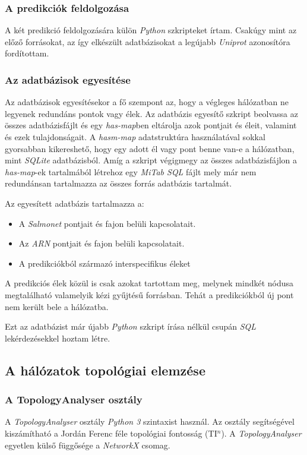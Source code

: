\documentclass[a4paper,12pt]{article}
\begin{document}
			\subsubsection{A predikciók feldolgozása} 
			A két predikció feldolgozására külön \textit{Python} szkripteket írtam. Csakúgy mint az előző forrásokat, az így elkészült adatbázisokat a legújabb \textit{Uniprot} azonosítóra fordítottam.
			
			
		

	\subsubsection{Az adatbázisok egyesítése}
		Az adatbázisok egyesítésekor a fő szempont az, hogy a végleges hálózatban ne legyenek redundáns pontok vagy élek. Az adatbázis egyesítő szkript beolvassa az összes adatbázisfájlt és egy \textit{has-map}ben eltárolja azok pontjait és éleit, valamint és ezek tulajdonságait. A \textit{hasm-map} adatstruktúra használatával sokkal gyorsabban kikereshető, hogy egy adott él vagy pont benne van-e a hálózatban, mint \textit{SQLite} adatbázisból. Amíg a szkript végigmegy az összes adatbázisfájlon a \textit{has-map}-ek tartalmából létrehoz egy \textit{MiTab SQL} fájlt mely már nem redundánsan tartalmazza az összes forrás adatbázis tartalmát.
		
		Az egyesített adatbázis tartalmazza a:
		\begin{itemize}
			\item A \textit{Salmonet} pontjait és fajon belüli kapcsolatait.
			\item Az \textit{ARN} pontjait és fajon belüli kapcsolatait.
			\item A predikciókból származó interspecifikus éleket
		\end{itemize}
		 
		 A predikciós élek közül is csak azokat tartottam meg, melynek mindkét nódusa megtalálható valamelyik kézi gyűjtésű forrásban. Tehát a predikciókból új pont nem került bele a hálózatba.
		
		Ezt az adatbázist már újabb \textit{Python} szkript írása nélkül csupán \textit{SQL} lekérdezésekkel hoztam létre.

	\subsection{A hálózatok topológiai elemzése}
	
		\subsubsection{A TopologyAnalyser osztály}
		A \textit{TopologyAnalyser} osztály \textit{Python 3} szintaxist használ. Az osztály segítségével kiszámítható a Jordán Ferenc féle topológiai fontosság (TI$^n$). A \textit{TopologyAnalyser} egyetlen külső függősége a \textit{NetworkX} csomag. 
		
\end{document}
